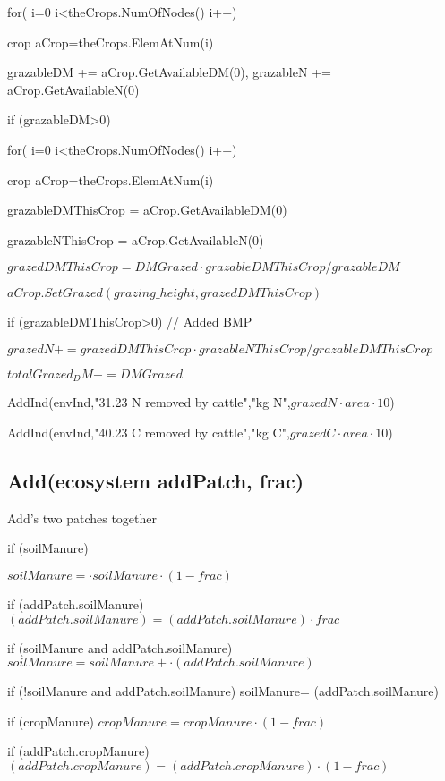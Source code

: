 \documentclass[%
]{scrartcl}
\begin{document}
for( i=0 i<theCrops.NumOfNodes() i++)

    \quad 	crop   aCrop=theCrops.ElemAtNum(i)

	 \quad 	grazableDM += aCrop.GetAvailableDM(0), grazableN += aCrop.GetAvailableN(0)
  
	if (grazableDM>0)

      for( i=0 i<theCrops.NumOfNodes() i++)
    
 \quad 	   	crop    aCrop=theCrops.ElemAtNum(i)

    \quad       grazableDMThisCrop = aCrop.GetAvailableDM(0)

     \quad      grazableNThisCrop = aCrop.GetAvailableN(0)

      \quad       $grazedDMThisCrop = DMGrazed  \cdot  grazableDMThisCrop/grazableDM$
  
\quad        $ aCrop.SetGrazed(grazing\_height, grazedDMThisCrop)$
     
\quad      if (grazableDMThisCrop>0) // Added BMP
  
\quad     \quad         $grazedN+=grazedDMThisCrop  \cdot  grazableNThisCrop/grazableDMThisCrop$

   
$totalGrazed_DM+=DMGrazed$

   AddInd(envInd,"31.23 N removed by cattle","kg N",$grazedN \cdot area \cdot 10$)
   
AddInd(envInd,"40.23 C removed by cattle","kg C",$grazedC \cdot area \cdot 10$)



\subsection{Add(ecosystem  addPatch, frac)}

Add's two patches together

   if (soilManure)
   
    \quad     $ soilManure= \cdot soilManure \cdot (1-frac)$
       
   if (addPatch.soilManure)       
   $ (addPatch.soilManure)=  (addPatch.soilManure) \cdot frac$
  
  
   if (soilManure  and  addPatch.soilManure)
       $ soilManure=  soilManure+ \cdot (addPatch.soilManure)$
 
 
   if (!soilManure  and  addPatch.soilManure)
       soilManure=  (addPatch.soilManure)
  
  
   if (cropManure)
       $ cropManure= cropManure \cdot (1-frac)$
  
  
   if (addPatch.cropManure)
    $  (addPatch.cropManure)=  (addPatch.cropManure) \cdot (1-frac)$
  
\end{document}
